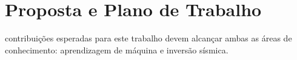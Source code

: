 \section{Proposta e Plano de Trabalho}
contribuições esperadas para este trabalho devem alcançar ambas as
áreas de conhecimento: aprendizagem de máquina e inversão sísmica.
% 
% 
% 
